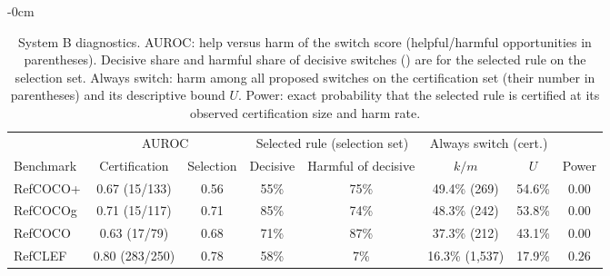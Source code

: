 \begin{table}[H]
\begin{adjustwidth}{-\extralength}{0cm}
\caption{System B diagnostics.  AUROC: help versus harm of the switch
score (helpful/harmful opportunities in parentheses).  Decisive share and
harmful share of decisive switches () are for the selected
rule on the selection set.  Always switch: harm among all proposed switches
on the certification set (their number in parentheses) and its descriptive
bound $U$.  Power: exact probability that the selected rule is certified at
its observed certification size and harm rate.\label{tab:sysb-diag}}
\centering
\small
\setlength{\tabcolsep}{4pt}
\begin{tabular}{@{}lccccccc@{}}
\toprule
& \multicolumn{2}{c}{AUROC} & \multicolumn{2}{c}{Selected rule (selection set)} & \multicolumn{2}{c}{Always switch (cert.)} & \\
\cmidrule(lr){2-3}\cmidrule(lr){4-5}\cmidrule(lr){6-7}
Benchmark & Certification & Selection & Decisive & Harmful of decisive & $k/m$ & $U$ & Power \\
\midrule
RefCOCO+ & 0.67 (15/133) & 0.56 & 55\% & 75\% & 49.4\% (269) & 54.6\% & 0.00 \\
RefCOCOg & 0.71 (15/117) & 0.71 & 85\% & 74\% & 48.3\% (242) & 53.8\% & 0.00 \\
RefCOCO & 0.63 (17/79) & 0.68 & 71\% & 87\% & 37.3\% (212) & 43.1\% & 0.00 \\
RefCLEF & 0.80 (283/250) & 0.78 & 58\% & 7\% & 16.3\% (1{,}537) & 17.9\% & 0.26 \\
\bottomrule
\end{tabular}
\end{adjustwidth}
\end{table}
